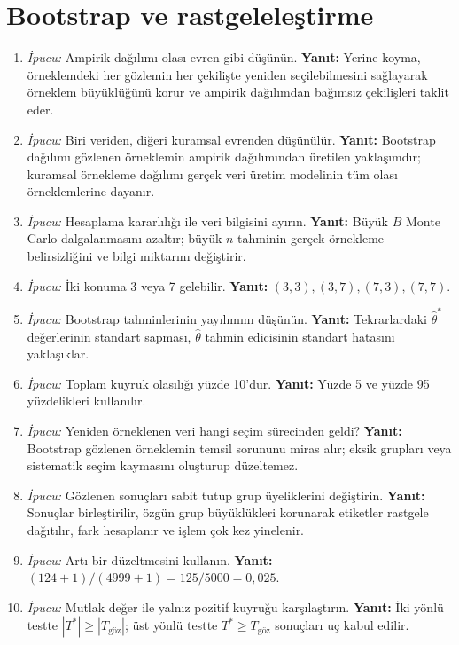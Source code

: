 \ifimoders\else
\section{Bootstrap ve rastgeleleştirme}

\begin{enumerate}[leftmargin=*,itemsep=5pt]
\item \emph{İpucu:} Ampirik dağılımı olası evren gibi düşünün.
\textbf{Yanıt:} Yerine koyma, örneklemdeki her gözlemin her çekilişte yeniden
seçilebilmesini sağlayarak örneklem büyüklüğünü korur ve ampirik dağılımdan
bağımsız çekilişleri taklit eder.
\item \emph{İpucu:} Biri veriden, diğeri kuramsal evrenden düşünülür.
\textbf{Yanıt:} Bootstrap dağılımı gözlenen örneklemin ampirik dağılımından
üretilen yaklaşımdır; kuramsal örnekleme dağılımı gerçek veri üretim modelinin
tüm olası örneklemlerine dayanır.
\item \emph{İpucu:} Hesaplama kararlılığı ile veri bilgisini ayırın.
\textbf{Yanıt:} Büyük $B$ Monte Carlo dalgalanmasını azaltır; büyük $n$
tahminin gerçek örnekleme belirsizliğini ve bilgi miktarını değiştirir.
\item \emph{İpucu:} İki konuma 3 veya 7 gelebilir.
\textbf{Yanıt:} $(3,3),(3,7),(7,3),(7,7)$.
\item \emph{İpucu:} Bootstrap tahminlerinin yayılımını düşünün.
\textbf{Yanıt:} Tekrarlardaki $\hat\theta^*$ değerlerinin standart sapması,
$\hat\theta$ tahmin edicisinin standart hatasını yaklaşıklar.
\item \emph{İpucu:} Toplam kuyruk olasılığı yüzde 10'dur.
\textbf{Yanıt:} Yüzde 5 ve yüzde 95 yüzdelikleri kullanılır.
\item \emph{İpucu:} Yeniden örneklenen veri hangi seçim sürecinden geldi?
\textbf{Yanıt:} Bootstrap gözlenen örneklemin temsil sorununu miras alır;
eksik grupları veya sistematik seçim kaymasını oluşturup düzeltemez.
\item \emph{İpucu:} Gözlenen sonuçları sabit tutup grup üyeliklerini değiştirin.
\textbf{Yanıt:} Sonuçlar birleştirilir, özgün grup büyüklükleri korunarak
etiketler rastgele dağıtılır, fark hesaplanır ve işlem çok kez yinelenir.
\item \emph{İpucu:} Artı bir düzeltmesini kullanın.
\textbf{Yanıt:} $(124+1)/(4999+1)=125/5000=0{,}025$.
\item \emph{İpucu:} Mutlak değer ile yalnız pozitif kuyruğu karşılaştırın.
\textbf{Yanıt:} İki yönlü testte $|T^*|\ge|T_{\text{göz}}|$; üst yönlü testte
$T^*\ge T_{\text{göz}}$ sonuçları uç kabul edilir.

\end{enumerate}
